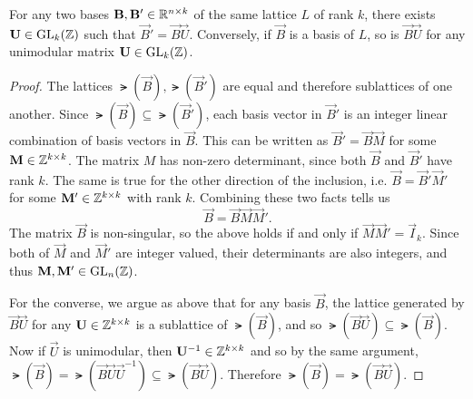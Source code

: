 

\begin{proposition}\label{prop:basesOfLattice} For any two bases $\mathbf{B}, \mathbf{B}' \in \mathbb{R}^{n \times k}$ of the same lattice $L$ of rank $k$, there exists $\mathbf{U} \in \operatorname{GL}_k(\mathbb{Z})$ such that $\vec B' = \vec B\vec U$. Conversely, if $\vec B$ is a basis of $L$, so is $\vec B \vec U$ for any unimodular matrix $\mathbf{U} \in \operatorname{GL}_k(\mathbb{Z})$.
\end{proposition}

\begin{proof}
The lattices $\lat (\vec B), \lat(\vec B')$ are equal and therefore sublattices of one another.
Since $\lat (\vec B) \subseteq \lat(\vec B')$, each basis vector in $\vec B'$ is an integer linear combination of basis vectors in $\vec B$.
This can be written as $\vec B' = \vec B \vec M$ for some $\mathbf{M} \in \mathbb{Z} ^{k \times k}$.
The matrix $M$ has non-zero determinant, since both $\vec B$ and $\vec B'$ have rank $k$.
The same is true for the other direction of the inclusion, i.e. $\vec B = \vec B' \vec M'$ for some $\mathbf{M}' \in \mathbb{Z}^{k \times k}$ with rank $k$.
Combining these two facts tells us
\[
\vec B = \vec B \vec M \vec M'.
\]
The matrix $\vec B$ is non-singular, so the above holds if and only if $\vec M \vec M' = \vec I_k$.
Since both of $\vec M$ and $\vec M'$ are integer valued, their determinants are also integers, and thus $\mathbf{M}, \mathbf{M}' \in \operatorname{GL}_n(\mathbb{Z})$.

For the converse, we argue as above that for any basis $\vec B$, the lattice generated by $\vec B \vec U$ for any $\mathbf{U} \in \mathbb{Z}^{k \times k}$ is a sublattice of $\lat(\vec B)$, and so $\lat(\vec B \vec U) \subseteq \lat (\vec B)$.
Now if $\vec U$ is unimodular, then $\mathbf{U}^{-1} \in \mathbb{Z}^{k \times k}$ and so by the same argument, $\lat (\vec B ) = \lat(\vec B \vec U \vec U^{-1}) \subseteq \lat (\vec B \vec U)$.
Therefore $\lat (\vec B ) = \lat (\vec B \vec U)$.
\end{proof}

